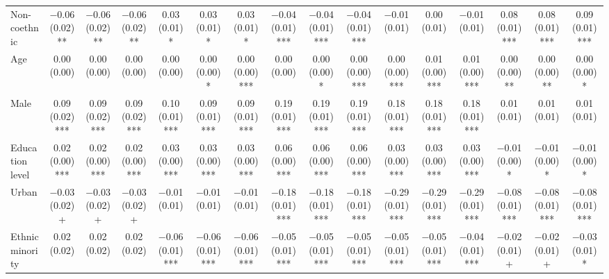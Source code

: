 \begin{table}
\begin{tabular}[t]{lccccccccccccccc}
Non-coethnic & \num{-0.06} (\num{0.02})** & \num{-0.06} (\num{0.02})** & \num{-0.06} (\num{0.02})** & \num{0.03} (\num{0.01})* & \num{0.03} (\num{0.01})* & \num{0.03} (\num{0.01})* & \num{-0.04} (\num{0.01})*** & \num{-0.04} (\num{0.01})*** & \num{-0.04} (\num{0.01})*** & \num{-0.01} (\num{0.01}) & \num{0.00} (\num{0.01}) & \num{-0.01} (\num{0.01}) & \num{0.08} (\num{0.01})*** & \num{0.08} (\num{0.01})*** & \num{0.09} (\num{0.01})***\\
Age & \num{0.00} (\num{0.00}) & \num{0.00} (\num{0.00}) & \num{0.00} (\num{0.00}) & \num{0.00} (\num{0.00}) & \num{0.00} (\num{0.00})* & \num{0.00} (\num{0.00})*** & \num{0.00} (\num{0.00}) & \num{0.00} (\num{0.00})* & \num{0.00} (\num{0.00})*** & \num{0.00} (\num{0.00})*** & \num{0.01} (\num{0.00})*** & \num{0.01} (\num{0.00})*** & \num{0.00} (\num{0.00})** & \num{0.00} (\num{0.00})** & \num{0.00} (\num{0.00})*\\
Male & \num{0.09} (\num{0.02})*** & \num{0.09} (\num{0.02})*** & \num{0.09} (\num{0.02})*** & \num{0.10} (\num{0.01})*** & \num{0.09} (\num{0.01})*** & \num{0.09} (\num{0.01})*** & \num{0.19} (\num{0.01})*** & \num{0.19} (\num{0.01})*** & \num{0.19} (\num{0.01})*** & \num{0.18} (\num{0.01})*** & \num{0.18} (\num{0.01})*** & \num{0.18} (\num{0.01})*** & \num{0.01} (\num{0.01}) & \num{0.01} (\num{0.01}) & \num{0.01} (\num{0.01})\\
Education level & \num{0.02} (\num{0.00})*** & \num{0.02} (\num{0.00})*** & \num{0.02} (\num{0.00})*** & \num{0.03} (\num{0.00})*** & \num{0.03} (\num{0.00})*** & \num{0.03} (\num{0.00})*** & \num{0.06} (\num{0.00})*** & \num{0.06} (\num{0.00})*** & \num{0.06} (\num{0.00})*** & \num{0.03} (\num{0.00})*** & \num{0.03} (\num{0.00})*** & \num{0.03} (\num{0.00})*** & \num{-0.01} (\num{0.00})* & \num{-0.01} (\num{0.00})* & \num{-0.01} (\num{0.00})*\\
Urban & \num{-0.03} (\num{0.02})+ & \num{-0.03} (\num{0.02})+ & \num{-0.03} (\num{0.02})+ & \num{-0.01} (\num{0.01}) & \num{-0.01} (\num{0.01}) & \num{-0.01} (\num{0.01}) & \num{-0.18} (\num{0.01})*** & \num{-0.18} (\num{0.01})*** & \num{-0.18} (\num{0.01})*** & \num{-0.29} (\num{0.01})*** & \num{-0.29} (\num{0.01})*** & \num{-0.29} (\num{0.01})*** & \num{-0.08} (\num{0.01})*** & \num{-0.08} (\num{0.01})*** & \num{-0.08} (\num{0.01})***\\
Ethnic minority & \num{0.02} (\num{0.02}) & \num{0.02} (\num{0.02}) & \num{0.02} (\num{0.02}) & \num{-0.06} (\num{0.01})*** & \num{-0.06} (\num{0.01})*** & \num{-0.06} (\num{0.01})*** & \num{-0.05} (\num{0.01})*** & \num{-0.05} (\num{0.01})*** & \num{-0.05} (\num{0.01})*** & \num{-0.05} (\num{0.01})*** & \num{-0.05} (\num{0.01})*** & \num{-0.04} (\num{0.01})*** & \num{-0.02} (\num{0.01})+ & \num{-0.02} (\num{0.01})+ & \num{-0.03} (\num{0.01})*\\

\end{tabular}
\end{table}
